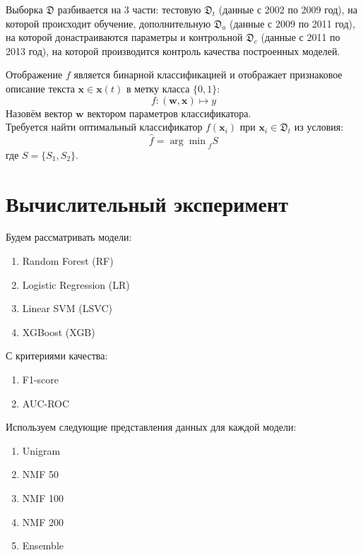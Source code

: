 \documentclass[12pt, twoside]{article}
\begin{document}
Выборка $\mathfrak{D}$ разбивается на 3 части: тестовую $\mathfrak{D}_t$ (данные с 2002 по 2009 год), на которой происходит обучение, дополнительную $\mathfrak{D}_a$ (данные с 2009 по 2011 год), на которой донастраиваются параметры и контрольной $\mathfrak{D}_c$ (данные с 2011 по 2013 год), на которой производится контроль качества построенных моделей.

Отображение $f$ является бинарной классификацией и отображает признаковое описание текста $\mathbf{x} \in \mathbf{x}(t)$ в метку класса $\{0, 1\}$: $$f: (\mathbf{w, x}) \mapsto y$$ Назовём вектор $\mathbf{w}$ вектором параметров классификатора.\\
Требуется найти оптимальный классификатор $f(\mathbf{x}_i)$ при $\mathbf{x}_i \in \mathfrak{D}_t$ из условия: $$\hat{f} = {\arg\!\min}_{f} S$$
где $S = \{S_1, S_2\}$. 

\section{Вычислительный эксперимент}

Будем рассматривать модели:
\begin{enumerate}
\item Random Forest (RF)
\item Logistic Regression (LR)
\item Linear SVM (LSVC)
\item XGBoost (XGB)
\end{enumerate}

С критериями качества:
\begin{enumerate}
\item F1-score
\item AUC-ROC
\end{enumerate}

Используем следующие представления данных для каждой модели:
\begin{enumerate}
\item Unigram
\item NMF 50
\item NMF 100
\item NMF 200
\item Ensemble
\end{enumerate}
\end{document}
